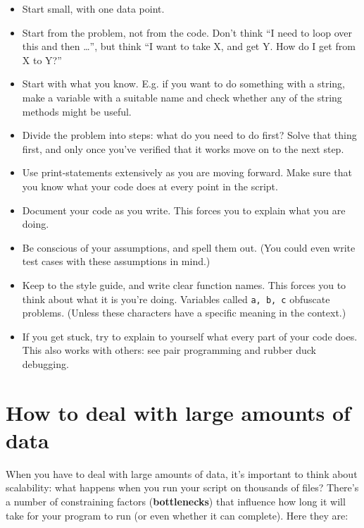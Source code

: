\documentclass[12pt]{book}
\begin{document}
\begin{itemize}
\item Start small, with one data point.
\item Start from the problem, not from the code. Don't think ``I need to loop over this and then \ldots{}'', but think ``I want to take X, and get Y. How do I get from X to Y?''
\item Start with what you know. E.g. if you want to do something with a string, make a variable with a suitable name and check whether any of the string methods might be useful.
\item Divide the problem into steps: what do you need to do first? Solve that thing first, and only once you've verified that it works move on to the next step.
\item Use print-statements extensively as you are moving forward. Make sure that you know what your code does at every point in the script.
\item Document your code as you write. This forces you to explain what you are doing.
\item Be conscious of your assumptions, and spell them out. (You could even write test cases with these assumptions in mind.)
\item Keep to the style guide, and write clear function names. This forces you to think about what it is you're doing. Variables called \texttt{a, b, c} obfuscate problems. (Unless these characters have a specific meaning in the context.)
\item If you get stuck, try to explain to yourself what every part of your code does. This also works with others: see pair programming and rubber duck debugging.
\end{itemize}

\section{How to deal with large amounts of data}

When you have to deal with large amounts of data, it's important to think about scalability: what happens when you run your script on thousands of files? There's a number of constraining factors (\textbf{bottlenecks}) that influence how long it will take for your program to run (or even whether it can complete). Here they are:
\end{document}
